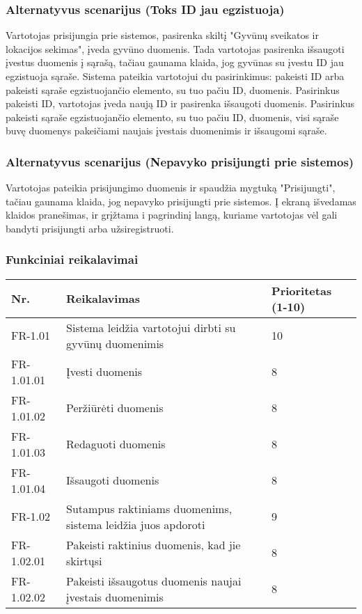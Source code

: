 \documentclass[oneside]{VUMIFPSkursinis}
\begin{document}
\subsubsection{Alternatyvus scenarijus (Toks ID jau egzistuoja)}
	Vartotojas prisijungia prie sistemos, pasirenka skiltį "Gyvūnų sveikatos ir lokacijos sekimas", įveda gyvūno duomenis. Tada vartotojas pasirenka išsaugoti įvestus duomenis į sąrašą, tačiau gaunama klaida, jog gyvūnas su įvestu ID jau egzistuoja sąraše. Sistema pateikia vartotojui du pasirinkimus: pakeisti ID arba pakeisti sąraše egzistuojančio elemento, su tuo pačiu ID, duomenis.
	Pasirinkus pakeisti ID, vartotojas įveda naują ID ir pasirenka išsaugoti duomenis. 
	Pasirinkus pakeisti sąraše egzistuojančio elemento, su tuo pačiu ID, duomenis, visi sąraše buvę duomenys pakeičiami naujais įvestais duomenimis ir išsaugomi sąraše.
\subsubsection{Alternatyvus scenarijus (Nepavyko prisijungti prie sistemos)}
	Vartotojas pateikia prisijungimo duomenis ir spaudžia mygtuką "Prisijungti", tačiau gaunama klaida, jog nepavyko prisijungti prie sistemos. Į ekraną išvedamas klaidos pranešimas, ir grįžtama i pagrindinį langą, kuriame vartotojas vėl gali bandyti prisijungti arba užsiregistruoti.
\subsubsection{Funkciniai reikalavimai}
\begin{table}[htbp]
	\begin{tabularx}{1\textwidth}{ |P{2.5cm}|X|P{3cm }| }
       	          \hline
           	Nr. & Reikalavimas &  Prioritetas (1-10)  \\   \hline 
         	FR-1.01 & Sistema leidžia vartotojui dirbti su gyvūnų duomenimis & 10  \\   \hline
		FR-1.01.01 & Įvesti duomenis & 8 \\ \hline
		FR-1.01.02 & Peržiūrėti duomenis & 8 \\ \hline
		FR-1.01.03 & Redaguoti duomenis & 8 \\ \hline
		FR-1.01.04 & Išsaugoti duomenis & 8 \\ \hline
        	FR-1.02 & Sutampus raktiniams duomenims, sistema leidžia juos apdoroti & 9   \\   \hline
		FR-1.02.01 & Pakeisti raktinius duomenis, kad jie skirtųsi & 8 \\ \hline
		FR-1.02.02 & Pakeisti išsaugotus duomenis naujai įvestais duomenimis & 8 \\ \hline
	\end{tabularx}
\end{table}
\end{document}
